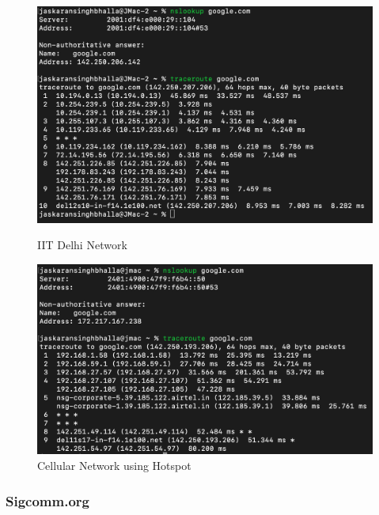 \documentclass{article}
\begin{document}
\begin{figure}[H]
    \centering
    \begin{minipage}{0.5\textwidth}
        \centering
        \includegraphics[width=\linewidth]{part-1/traceroute-iitd-google.png}
        \caption{IIT Delhi Network}
    \end{minipage}
    \hfill
    \begin{minipage}{0.45\textwidth}
        \centering
        \includegraphics[width=\linewidth]{part-1/traceroute-celluar-google.png}
        \caption{Cellular Network using Hotspot}
    \end{minipage}
\end{figure}

\subsubsection*{Sigcomm.org}
\end{document}
